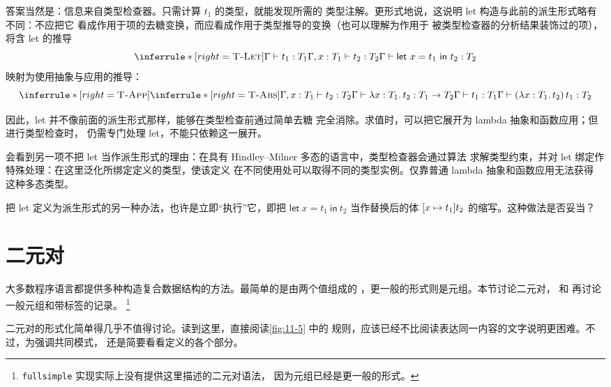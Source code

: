 答案当然是：信息来自类型检查器。只需计算 \(t_1\) 的类型，就能发现所需的
类型注解。更形式地说，这说明 let 构造与此前的派生形式略有不同：不应把它
看成作用于项的去糖变换，而应看成作用于类型推导的变换（也可以理解为作用于
被类型检查器的分析结果装饰过的项），将含 let 的推导
\[
\inferrule*[right=\textsc{T-Let}]
 {\Gamma\vdash t_1:T_1\\\Gamma,x:T_1\vdash t_2:T_2}
 {\Gamma\vdash\mathsf{let}\ x=t_1\ \mathsf{in}\ t_2:T_2}
\]
映射为使用抽象与应用的推导：
\[
\inferrule*[right=\textsc{T-App}]
 {\inferrule*[right=\textsc{T-Abs}]
   {\Gamma,x:T_1\vdash t_2:T_2}
   {\Gamma\vdash\lambda x:T_1.\,t_2:T_1\to T_2}
 \\
 \Gamma\vdash t_1:T_1}
 {\Gamma\vdash(\lambda x:T_1.\,t_2)\,t_1:T_2}
\]

因此，let 并不像前面的派生形式那样，能够在类型检查前通过简单去糖
完全消除。求值时，可以把它展开为 lambda 抽象和函数应用；但进行类型检查时，
仍需专门处理 let，不能只依赖这一展开。

会看到另一项不把 let 当作派生形式的理由：在具有
Hindley--Milner 多态的语言中，类型检查器会通过算法
求解类型约束，并对 let 绑定作特殊处理：在这里泛化所绑定定义的类型，使该定义
在不同使用处可以取得不同的类型实例。仅靠普通 lambda 抽象和函数应用无法获得
这种多态类型。

\begin{exercise}[\(\star\star\)]
\label{ex:11.5.2}
把 let 定义为派生形式的另一种办法，也许是立即“执行”它，即把
\(\mathsf{let}\ x=t_1\ \mathsf{in}\ t_2\) 当作替换后的体
\([x\mapsto t_1]t_2\) 的缩写。这种做法是否妥当？
\end{exercise}

\section{二元对}
\label{sec:11.6}

大多数程序语言都提供多种构造复合数据结构的方法。最简单的是由两个值组成的
，更一般的形式则是元组。本节讨论二元对，
 和  再讨论一般元组和带标签的记录。
\footnote{\texttt{fullsimple} 实现实际上没有提供这里描述的二元对语法，
因为元组已经是更一般的形式。}

二元对的形式化简单得几乎不值得讨论。读到这里，直接阅读\cref{fig:11-5} 中的
规则，应该已经不比阅读表达同一内容的文字说明更困难。不过，为强调共同模式，
还是简要看看定义的各个部分。


